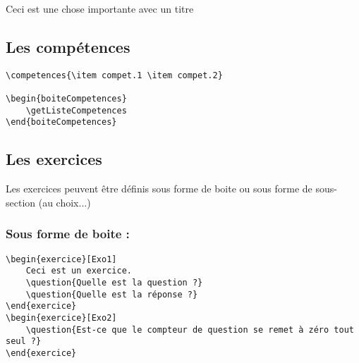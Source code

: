 \documentclass[a4paper,10pt]{article}
\begin{document}
\begin{important}[Titre]
	Ceci est une chose importante avec un titre
\end{important}



		\subsection{Les compétences}

			\begin{verbatim}
\competences{\item compet.1 \item compet.2}

\begin{boiteCompetences}
	\getListeCompetences
\end{boiteCompetences}
			\end{verbatim}

		
		
			\bgroup
			\begin{boiteCompetences}
				\getListeCompetences
			\end{boiteCompetences}
			\egroup
			
			
		\subsection{Les exercices}

		Les exercices peuvent être définis sous forme de boite ou sous forme de sous-section (au choix...)
		
			\subsubsection{Sous forme de boite :}
		
		\begin{verbatim}
\begin{exercice}[Exo1]
	Ceci est un exercice.
	\question{Quelle est la question ?}
	\question{Quelle est la réponse ?}
\end{exercice}
\begin{exercice}[Exo2]
	\question{Est-ce que le compteur de question se remet à zéro tout seul ?}
\end{exercice}
		\end{verbatim}
		
\end{document}
